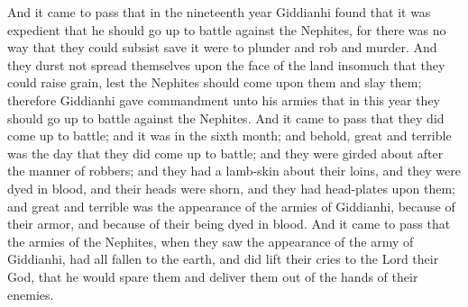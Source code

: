And it came to pass that in the nineteenth year Giddianhi found that it was expedient that he should go up to battle against the Nephites, for there was no way that they could subsist save it were to plunder and rob and murder.
\bverse \iffalse And they durst not spread themselves upon the face of the land insomuch that they could raise grain, lest the Nephites should come upon them and slay them; therefore Giddianhi gave commandment unto his armies that in this year they should go up to battle against the Nephites. \fi
And they durst not spread themselves upon the face of the land insomuch that they could raise grain, lest the Nephites should come upon them and slay them; therefore Giddianhi gave commandment unto his armies that in this year they should go up to battle against the Nephites.
\bverse \iffalse And it came to pass that they did come up to battle; and it was in the sixth month; and behold, great and terrible was the day that they did come up to battle; and they were girded about after the manner of robbers; and they had a lamb-skin about their loins, and they were dyed in blood, and their heads were shorn, and they had head-plates upon them; and great and terrible was the appearance of the armies of Giddianhi, because of their armor, and because of their being dyed in blood. \fi
And it came to pass that they did come up to battle; and it was in the sixth month; and behold, great and terrible was the day that they did come up to battle; and they were girded about after the manner of robbers; and they had a lamb-skin about their loins, and they were dyed in blood, and their heads were shorn, and they had head-plates upon them; and great and terrible was the appearance of the armies of Giddianhi, because of their armor, and because of their being dyed in blood.
\bverse \iffalse And it came to pass that the armies of the Nephites, when they saw the appearance of the army of Giddianhi, had all fallen to the earth, and did lift their cries to the Lord their God, that he would spare them and deliver them out of the hands of their enemies. \fi
And it came to pass that the armies of the Nephites, when they saw the appearance of the army of Giddianhi, had all fallen to the earth, and did lift their cries to the Lord their God, that he would spare them and deliver them out of the hands of their enemies.
\bverse \iffalse And it came to pass that when the armies of Giddianhi saw this they began to shout with a loud voice, because of their joy, for they had supposed that the Nephites had fallen with fear because of the terror of their armies. \fi
